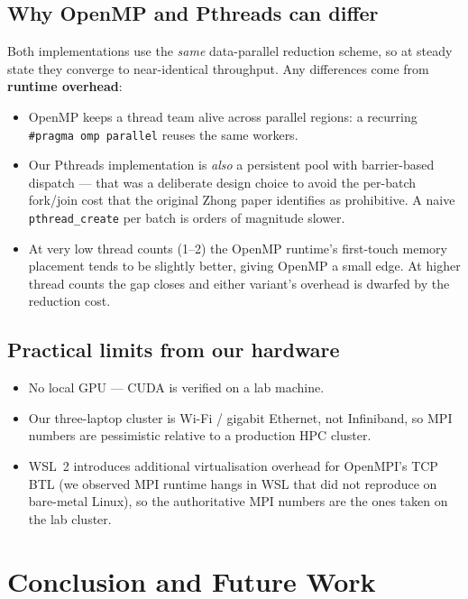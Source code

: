 \documentclass[11pt,a4paper]{article}
\begin{document}
\subsection{Why OpenMP and Pthreads can differ}

Both implementations use the \emph{same} data-parallel reduction scheme,
so at steady state they converge to near-identical throughput. Any
differences come from \textbf{runtime overhead}:

\begin{itemize}[noitemsep,topsep=2pt]
  \item OpenMP keeps a thread team alive across parallel regions: a
  recurring \verb|#pragma omp parallel| reuses the same workers.
  \item Our Pthreads implementation is \emph{also} a persistent pool with
  barrier-based dispatch --- that was a deliberate design choice to
  avoid the per-batch fork/join cost that the original Zhong paper
  identifies as prohibitive. A naive \texttt{pthread\_create} per batch
  is orders of magnitude slower.
  \item At very low thread counts (1--2) the OpenMP runtime's first-touch
  memory placement tends to be slightly better, giving OpenMP a small
  edge. At higher thread counts the gap closes and either variant's
  overhead is dwarfed by the reduction cost.
\end{itemize}

\subsection{Practical limits from our hardware}

\begin{itemize}[noitemsep,topsep=2pt]
  \item No local GPU --- CUDA is verified on a lab machine.
  \item Our three-laptop cluster is Wi-Fi / gigabit Ethernet, not
  Infiniband, so MPI numbers are pessimistic relative to a production
  HPC cluster.
  \item WSL~2 introduces additional virtualisation overhead for OpenMPI's
  TCP BTL (we observed MPI runtime hangs in WSL that did not reproduce on
  bare-metal Linux), so the authoritative MPI numbers are the ones taken
  on the lab cluster.
\end{itemize}

\section{Conclusion and Future Work}\label{sec:conclusion}
\end{document}

